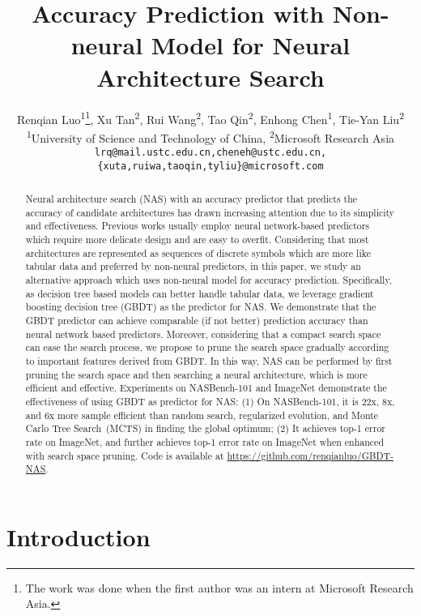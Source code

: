 \documentclass{article}
\title{Accuracy Prediction with Non-neural Model for Neural Architecture Search}
\author{Renqian Luo\textsuperscript{\rm 1}\thanks{The work was done when the first author was an intern at Microsoft Research Asia.}, Xu Tan\textsuperscript{\rm 2}, Rui Wang\textsuperscript{\rm 2}, Tao Qin\textsuperscript{\rm 2}, Enhong Chen\textsuperscript{\rm 1}, Tie-Yan Liu\textsuperscript{\rm 2}\\
  \textsuperscript{\rm 1}University of Science and Technology of China, \textsuperscript{\rm 2}Microsoft Research Asia\\
  \texttt{lrq@mail.ustc.edu.cn,cheneh@ustc.edu.cn,}\\
  \texttt{\{xuta,ruiwa,taoqin,tyliu\}@microsoft.com}
}
\begin{document}
\maketitle

\begin{abstract}
Neural architecture search (NAS) with an accuracy predictor that predicts the accuracy of candidate architectures has drawn increasing attention due to its simplicity and effectiveness. Previous works usually employ neural network-based predictors which require more delicate design and are easy to overfit. Considering that most architectures are represented as sequences of discrete symbols which are more like tabular data and preferred by non-neural predictors, in this paper, we study an alternative approach which uses non-neural model for accuracy prediction. Specifically, as decision tree based models can better handle tabular data, we leverage gradient boosting decision tree (GBDT) as the predictor for NAS. We demonstrate that the GBDT predictor can achieve comparable (if not better) prediction accuracy than neural network based predictors. Moreover, considering that a compact search space can ease the search process, we propose to prune the search space gradually according to important features derived from GBDT. In this way, NAS can be performed by first pruning the search space and then searching a neural architecture, which is more efficient and effective. Experiments on NASBench-101 and ImageNet demonstrate the effectiveness of using GBDT as predictor for NAS: (1) On NASBench-101, it is 22x, 8x, and 6x more sample efficient than random search, regularized evolution, and Monte Carlo Tree Search~(MCTS) in finding the global optimum; (2) It achieves  top-1 error rate on ImageNet, and further achieves  top-1 error rate on ImageNet when enhanced with search space pruning. Code is available at \url{https://github.com/renqianluo/GBDT-NAS}.
\end{abstract}

\section{Introduction}
\label{sec:intro}
\end{document}
